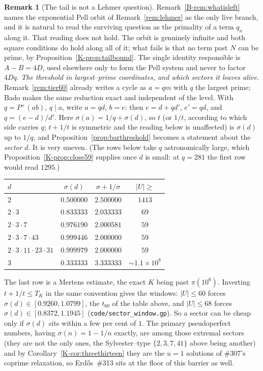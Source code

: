 \documentclass[11pt]{article}
\theoremstyle{definition}
\newtheorem{remark}[theorem]{Remark}
\begin{document}
\begin{remark}[The tail is not a Lehmer question]\label{rem:notlehmer}
Remark~\ref{B-rem:whatisleft} names the exponential Pell orbit of Remark~\ref{rem:lehmer} as the only live branch, and it is natural to read the surviving question as the primality of a term $q_n$ along it. That reading does not hold. The orbit is genuinely infinite and both square conditions do hold along all of it; what fails is that no term past $N$ can be prime, by Proposition~\ref{K-prop:tailbound}. The single identity responsible is $A-B=4D$, used elsewhere only to form the Pell
system and never to factor $4Dq$.
\emph{The threshold in largest--prime coordinates, and which sectors it leaves alive.} Remark~\ref{rem:tier60} already writes a cycle as $a=qm$ with $q$ the largest prime; Bado
\cite{Bado2026} makes the same reduction exact and independent of the level. With $q=P^{+}(ab)$,
$q\mid a$, write $a=qd$, $b=e$: then $e=d+qd'$, $e'=qd$, and $q=(e-d)/d'$. Here
$\sigma(a)=1/q+\sigma(d)$, so $t$ (or $1/t$, according to which side carries $q$; $t+1/t$ is
symmetric and the reading below is unaffected) is $\sigma(d)$ up to $1/q$, and
Proposition~\ref{prop:barthreshold} becomes a statement about the \emph{sector} $d$. It is very
uneven. \textup{(}The rows below take $q$ astronomically large, which
Proposition~\ref{K-prop:close59} supplies once $d$ is small: at $q=281$ the first row would read
$1295$.\textup{)}

\smallskip
\begin{center}
\begin{tabular}{lccc}
$d$ & $\sigma(d)$ & $\sigma+1/\sigma$ & $|U|\ge$\\ \hline
$2$ & $0.500000$ & $2.500000$ & $1413$\\
$2\cdot3$ & $0.833333$ & $2.033333$ & $69$\\
$2\cdot3\cdot7$ & $0.976190$ & $2.000581$ & $59$\\
$2\cdot3\cdot7\cdot43$ & $0.999446$ & $2.000000$ & $59$\\
$2\cdot3\cdot11\cdot23\cdot31$ & $0.999979$ & $2.000000$ & $59$\\
$3$ & $0.333333$ & $3.333333$ & ${\sim}1.1\times10^{8}$\\
\end{tabular}
\end{center}
\smallskip

The last row is a Mertens estimate, the exact $K$ being past $\pi(10^6)$. Inverting
$t+1/t\le T_K$ in the same convention gives the windows: $|U|\le60$ forces
$\sigma(d)\in[0.9260,1.0799]$, the $t_{60}$ of the table above, and $|U|\le68$ forces
$\sigma(d)\in[0.8372,1.1945]$ \textup{(\texttt{code/sector\_window.gp})}. So a sector can be cheap
only if $\sigma(d)$ sits within a few per cent of $1$. The primary pseudoperfect numbers, having
$\sigma(n)=1-1/n$ exactly, are among those extremal sectors (they are not the only ones, the
Sylvester--type $\{2,3,7,41\}$ above being another) and by
Corollary~\ref{K-cor:threethirteen} they are the $u=1$ solutions of \#307's coprime relaxation, so
Erd\H{o}s~\#313 sits at the floor of this barrier as well.


\end{remark}
\end{document}
